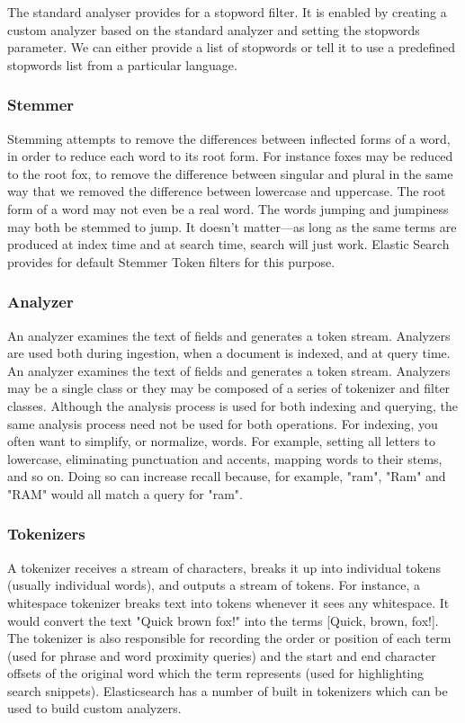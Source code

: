 \documentclass[a4paper,12pt,oneside]{book}
\begin{document}
The standard analyser provides for a stopword filter. It is enabled by creating a custom analyzer based on the standard analyzer and setting the stopwords parameter. We can either provide a list of stopwords or tell it to use a predefined stopwords list from a particular language.

\subsubsection{Stemmer}
Stemming attempts to remove the differences between inflected forms of a word, in order to reduce each word to its root form. For instance foxes may be reduced to the root fox, to remove the difference between singular and plural in the same way that we removed the difference between lowercase and uppercase. The root form of a word may not even be a real word. The words jumping and jumpiness may both be stemmed to jump. It doesn’t matter—as long as the same terms are produced at index time and at search time, search will just work. Elastic Search provides for default Stemmer Token filters for this purpose.

\subsubsection{Analyzer}
An analyzer examines the text of fields and generates a token stream. Analyzers are used both during ingestion, when a document is indexed, and at query time. An analyzer examines the text of fields and generates a token stream. Analyzers may be a single class or they may be composed of a series of tokenizer and filter classes. Although the analysis process is used for both indexing and querying, the same analysis process need not be used for both operations. For indexing, you often want to simplify, or normalize, words. For example, setting all letters to lowercase, eliminating punctuation and accents, mapping words to their stems, and so on. Doing so can increase recall because, for example, "ram", "Ram" and "RAM" would all match a query for "ram".

\lipsum[5]

\subsubsection{Tokenizers}
A tokenizer receives a stream of characters, breaks it up into individual tokens (usually individual words), and outputs a stream of tokens. For instance, a whitespace tokenizer breaks text into tokens whenever it sees any whitespace. It would convert the text "Quick brown fox!" into the terms [Quick, brown, fox!].
The tokenizer is also responsible for recording the order or position of each term (used for phrase and word proximity queries) and the start and end character offsets of the original word which the term represents (used for highlighting search snippets). Elasticsearch has a number of built in tokenizers which can be used to build custom analyzers.
\end{document}
